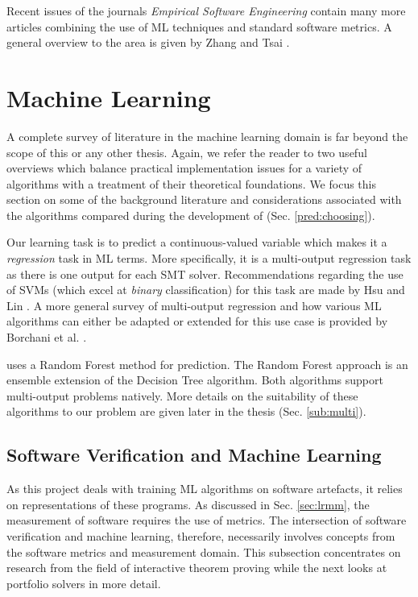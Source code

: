 Recent issues of the journals \textit{Empirical Software Engineering} contain many more articles combining the use of ML techniques and standard software metrics. A general overview to the area is given by Zhang and Tsai \cite{ML4SE}.  

\section{Machine Learning}
\label{sec:lrml}

A complete survey of literature in the machine learning domain is far beyond the scope of this or any other thesis. Again, we refer the reader to two useful overviews \cite{Bishop, Mitchell} which balance practical implementation issues for a variety of algorithms with a treatment of their theoretical foundations. We focus this section on some of the background literature and considerations associated with the algorithms compared during the development of \where (Sec. \ref{pred:choosing}).

Our learning task is to predict a continuous-valued variable which makes it a \textit{regression} task in ML terms. More specifically, it is a multi-output regression task as there is one output for each SMT solver. Recommendations regarding the use of SVMs (which excel at \textit{binary} classification) for this task are made by Hsu and Lin \cite{MulticlassSVM}. A more general survey of multi-output regression and how various ML algorithms can either be adapted or extended for this use case is provided by Borchani et al. \cite{multisurvey}. 

\where uses a Random Forest \cite{RandomForests} method for prediction. The Random Forest approach is an ensemble extension of the Decision Tree \cite{DecisionTrees} algorithm. Both algorithms support multi-output problems natively. More details on the suitability of these algorithms to our problem are given later in the thesis (Sec. \ref{sub:multi}). 



\subsection{Software Verification and Machine Learning}
\label{sub:lrsvml}

As this project deals with training ML algorithms on software artefacts, it relies on representations of these programs. As discussed in Sec. \ref{sec:lrmm}, the measurement of software requires the use of metrics. The intersection of software verification and machine learning, therefore, necessarily involves concepts from the software metrics and measurement domain. This subsection concentrates on research from the field of interactive theorem proving while the next looks at portfolio solvers in more detail.

